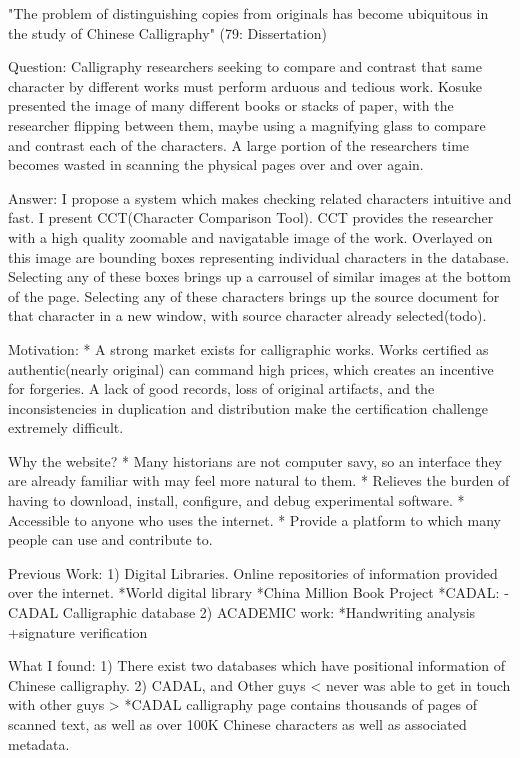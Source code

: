 

"The problem of distinguishing copies from originals has become ubiquitous in the study of Chinese Calligraphy" (79: Dissertation)

    Question:  Calligraphy researchers seeking to compare and contrast that same character by different works must perform arduous and tedious work.
                Kosuke presented the image of many different books or stacks of paper, with the researcher flipping between them,  maybe using a magnifying glass to compare and contrast each of the characters.  A large portion of the researchers time becomes wasted in scanning the physical pages over and over again.


    Answer:  I propose a system which makes checking related characters intuitive and fast.  I present CCT(Character Comparison Tool).  CCT provides the researcher with a high quality zoomable and navigatable image of the work.  Overlayed on this image are bounding boxes representing individual characters in the database.  Selecting any of these boxes brings up a carrousel of similar images at the bottom of the page.  Selecting any of these characters brings up the source document for that character in a new window, with source character already selected(todo).  

Motivation:
    *  A strong market exists for calligraphic works.  Works certified as authentic(nearly original) can command high prices, which creates an incentive for forgeries.  A lack of good records, loss of original artifacts, and the inconsistencies in duplication and distribution make the certification challenge extremely difficult.
    
Why the website?
    * Many historians are not computer savy, so an interface they are already familiar with may feel more natural to them.
    * Relieves the burden of having to download, install, configure, and debug experimental software.
    * Accessible to anyone who uses the internet.
    * Provide  a platform to which many people can use and contribute to.

    
Previous Work:
    1) Digital Libraries.  Online repositories of information provided over the internet.
        *World digital library
        *China Million Book Project
            *CADAL:
                -CADAL Calligraphic database
    2) ACADEMIC work:
        *Handwriting analysis
            +signature verification
            

What I found:
    1)  There exist two databases which have positional information of Chinese calligraphy.
    2)  CADAL, and Other guys < never was able to get in touch with other guys >
        *CADAL calligraphy page contains thousands of pages of scanned text, as well as over 100K Chinese characters as well as associated metadata.

